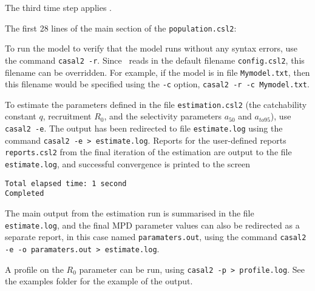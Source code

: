 The third time step applies .

The first 28 lines of the main section of the \texttt{population.csl2}:



To run the model to verify that the model runs without any syntax errors, use the command \texttt{casal2 -r}. Since \CNAME\ reads in the default filename \texttt{config.csl2}, this filename can be overridden. For example, if the model is in file \texttt{Mymodel.txt}, then this filename would be specified using the \texttt{-c} option, \texttt{casal2 -r -c Mymodel.txt}.

To estimate the parameters defined in the file \texttt{estimation.csl2} (the catchability constant $q$, recruitment $R_0$, and the selectivity parameters $a_{50}$ and $a_{to95}$), use \texttt{casal2 -e}. The output has been redirected to file  \texttt{estimate.log} using the command \texttt{casal2 -e > estimate.log}. Reports for the user-defined reports \texttt{reports.csl2} from the final iteration of the estimation are output to the file \texttt{estimate.log}, and successful convergence is printed to the screen

{\small{\begin{verbatim}
Total elapsed time: 1 second
Completed
\end{verbatim}}}

The main output from the estimation run is summarised in the file \texttt{estimate.log}, and the final MPD parameter values can also be redirected as a separate report, in this case named \texttt{paramaters.out}, using the command \texttt{casal2 -e -o paramaters.out > estimate.log}.

A profile on the $R_0$ parameter can be run, using \texttt{casal2 -p > profile.log}. See the examples folder for the example of the output.

